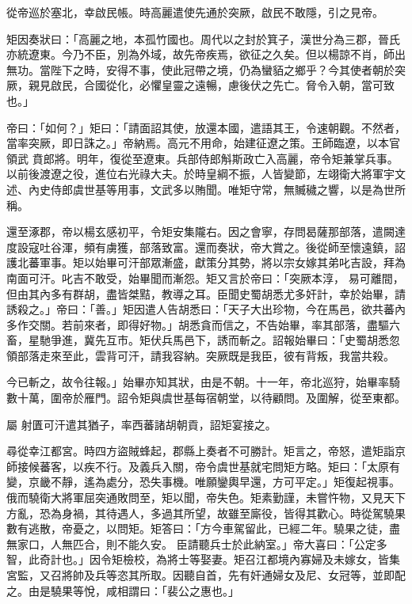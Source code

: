 \begin{pinyinscope}
 從帝巡於塞北，幸啟民帳。時高麗遣使先通於突厥，啟民不敢隱，引之見帝。



 矩因奏狀曰：「高麗之地，本孤竹國也。周代以之封於箕子，漢世分為三郡，晉氏亦統遼東。今乃不臣，別為外域，故先帝疾焉，欲征之久矣。但以楊諒不肖，師出無功。當陛下之時，安得不事，使此冠帶之境，仍為蠻貊之鄉乎？今其使者朝於突厥，親見啟民，合國從化，必懼皇靈之遠暢，慮後伏之先亡。脅令入朝，當可致也。」



 帝曰：「如何？」矩曰：「請面詔其使，放還本國，遣語其王，令速朝觀。不然者，當率突厥，即日誅之。」帝納焉。高元不用命，始建征遼之策。王師臨遼，以本官領武
 賁郎將。明年，復從至遼東。兵部侍郎斛斯政亡入高麗，帝令矩兼掌兵事。以前後渡遼之役，進位右光祿大夫。於時皇綱不振，人皆變節，左翊衛大將軍宇文述、內史侍郎虞世基等用事，文武多以賄聞。唯矩守常，無贓穢之響，以是為世所稱。



 還至涿郡，帝以楊玄感初平，令矩安集隴右。因之會寧，存問曷薩那部落，遣闕達度設寇吐谷渾，頻有虜獲，部落致富。還而奏狀，帝大賞之。後從師至懷遠鎮，詔護北蕃軍事。矩以始畢可汗部眾漸盛，獻策分其勢，將以宗女嫁其弟叱吉設，拜為南面可汗。叱吉不敢受，始畢聞而漸怨。矩又言於帝曰：「突厥本淳，
 易可離間，但由其內多有群胡，盡皆桀黠，教導之耳。臣聞史蜀胡悉尤多奸計，幸於始畢，請誘殺之。」帝曰：「善。」矩因遣人告胡悉曰：「天子大出珍物，今在馬邑，欲共蕃內多作交關。若前來者，即得好物。」胡悉貪而信之，不告始畢，率其部落，盡驅六畜，星馳爭進，冀先互市。矩伏兵馬邑下，誘而斬之。詔報始畢曰：「史蜀胡悉忽領部落走來至此，雲背可汗，請我容納。突厥既是我臣，彼有背叛，我當共殺。



 今已斬之，故令往報。」始畢亦知其狀，由是不朝。十一年，帝北巡狩，始畢率騎數十萬，圍帝於雁門。詔令矩與虞世基每宿朝堂，以待顧問。及圍解，從至東都。



 屬
 射匱可汗遣其猶子，率西蕃諸胡朝貢，詔矩宴接之。



 尋從幸江都宮。時四方盜賊蜂起，郡縣上奏者不可勝計。矩言之，帝怒，遣矩詣京師接候蕃客，以疾不行。及義兵入關，帝令虞世基就宅問矩方略。矩曰：「太原有變，京畿不靜，遙為處分，恐失事機。唯願鑾輿早還，方可平定。」矩復起視事。俄而驍衛大將軍屈突通敗問至，矩以聞，帝失色。矩素勤謹，未嘗忤物，又見天下方亂，恐為身禍，其待遇人，多過其所望，故雖至廝役，皆得其歡心。時從駕驍果數有逃散，帝憂之，以問矩。矩答曰：「方今車駕留此，已經二年。驍果之徒，盡無家口，人無匹合，則不能久安。
 臣請聽兵士於此納室。」帝大喜曰：「公定多智，此奇計也。」因令矩檢校，為將士等娶妻。矩召江都境內寡婦及未嫁女，皆集宮監，又召將帥及兵等恣其所取。因聽自首，先有奸通婦女及尼、女冠等，並即配之。由是驍果等悅，咸相謂曰：「裴公之惠也。」




\end{pinyinscope}
